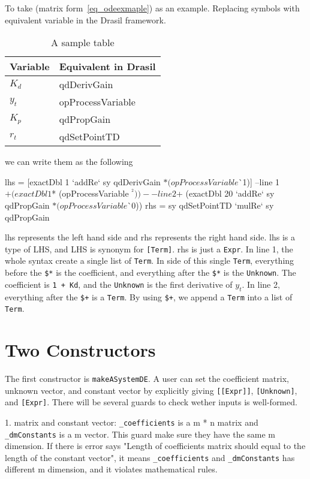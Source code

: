 To take (matrix form~\ref{eq_odeexmaple}) as an example. Replacing symbols with equivalent variable in the Drasil framework.

\begin{table}
	\begin{tabular}{ p{} p{} }
		\textbf{Variable} & \textbf{Equivalent in Drasil} \\
		\toprule
		$K_d$ & qdDerivGain\\
		$y_t$ & opProcessVariable\\
		$K_p$ & qdPropGain\\
		$r_t$ & qdSetPointTD\\
		\bottomrule	
	\end{tabular}	
	\caption{A sample table}	
	\label{tab_inputtype}
\end{table}

we can write them as the following
\begin{haskell1}
lhs = [exactDbl 1 `addRe` sy qdDerivGain $* (opProcessVariable $^^ 1)] --line 1
 $+ (exactDbl 1 $* (opProcessVariable $^^ 2)) -- line 2
 $+ (exactDbl 20 `addRe` sy qdPropGain $* (opProcessVariable $^^ 0))
rhs = sy qdSetPointTD `mulRe` sy qdPropGain
\end{haskell1}

lhs represents the left hand side and rhs represents the right hand side. lhs is a type of LHS, and LHS is synonym for \verb|[Term]|. rhs is just a \verb|Expr|. In line 1, the whole syntax create a single list of \verb|Term|. In side of this single \verb|Term|, everything before the \verb|$*| is the coefficient, and everything after the \verb|$*| is the \verb|Unknown|. The coefficient is \verb|1 + Kd|, and the \verb|Unknown| is the first derivative of $y_t$. In line 2, everything after the \verb|$+| is a \verb|Term|. By using \verb|$+|, we append a \verb|Term| into a list of \verb|Term|.

\section{Two Constructors}
The first constructor is \verb|makeASystemDE|. A user can set the coefficient matrix, unknown vector, and constant vector by explicitly giving \verb|[[Expr]]|, \verb|[Unknown]|, and \verb|[Expr]|. There will be several guards to check wether inputs is well-formed.

1. matrix and constant vector: \verb|_coefficients| is a m * n matrix and \verb|_dmConstants| is a m vector. This guard make sure they have the same m dimension. If there is error says "Length of coefficients matrix should equal to the length of the constant vector", it means \verb|_coefficients| and \verb|_dmConstants| has different m dimension, and it violates mathematical rules.

